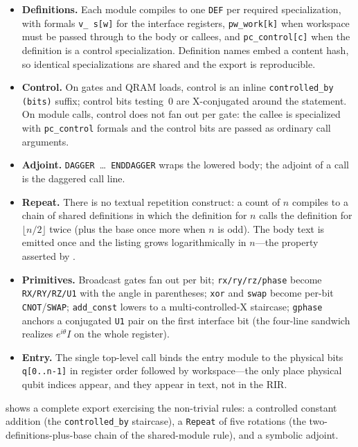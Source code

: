 \begin{itemize}
\item \textbf{Definitions.}  Each module compiles to one \texttt{DEF} per
  required specialization, with formals \texttt{v\_\ s[w]} for the
  interface registers, \texttt{pw\_work[k]} when workspace must be passed
  through to the body or callees, and \texttt{pc\_control[c]} when the
  definition is a control specialization.  Definition names embed a
  content hash, so identical specializations are shared and the export is
  reproducible.
\item \textbf{Control.}  On gates and QRAM loads, control is an inline
  \texttt{controlled\_by (bits)} suffix; control bits testing~0 are
  X-conjugated around the statement.  On module calls, control does not
  fan out per gate: the callee is specialized with \texttt{pc\_control}
  formals and the control bits are passed as ordinary call arguments.
\item \textbf{Adjoint.}  \texttt{DAGGER}~\dots~\texttt{ENDDAGGER} wraps the
  lowered body; the adjoint of a call is the daggered call line.
\item \textbf{Repeat.}  There is no textual repetition construct: a count
  of $n$ compiles to a chain of shared definitions in which the definition
  for $n$ calls the definition for $\lfloor n/2 \rfloor$ twice (plus the
  base once more when $n$ is odd).  The body text is emitted once and the
  listing grows logarithmically in $n$---the property asserted by
  .
\item \textbf{Primitives.}  Broadcast gates fan out per bit;
  \texttt{rx/ry/rz/phase} become \texttt{RX/RY/RZ/U1} with the angle in
  parentheses; \texttt{xor} and \texttt{swap} become per-bit
  \texttt{CNOT}/\texttt{SWAP}; \texttt{add\_const} lowers to a
  multi-controlled-X staircase; \texttt{gphase} anchors a conjugated
  \texttt{U1} pair on the first interface bit (the four-line sandwich
  realizes $e^{i\theta}I$ on the whole register).
\item \textbf{Entry.}  The single top-level call binds the entry module to
  the physical bits \texttt{q[0..n-1]} in register order followed by
  workspace---the only place physical qubit indices appear, and they
  appear in text, not in the RIR.
\end{itemize}

 shows a complete export exercising the
non-trivial rules: a controlled constant addition (the
\texttt{controlled\_by} staircase), a \texttt{Repeat} of five rotations
(the two-definitions-plus-base chain of the shared-module rule), and a
symbolic adjoint.

